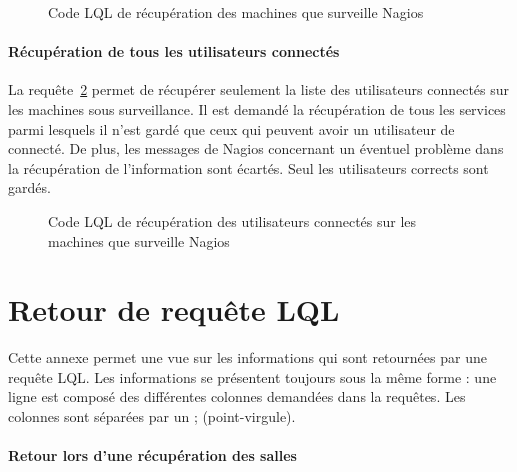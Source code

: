 \begin{appendices}
\begin{figure}[!ht]
	
	\caption{Code LQL de r\'ecup\'eration des machines que surveille Nagios}
	\label{annexe:nagiosGetResources}

\end{figure}

\subsubsection{R\'ecup\'eration de tous les utilisateurs connect\'es}

La requ\^ete~\ref{annexe:nagiosGetUsersLogged} permet de r\'ecup\'erer seulement la liste des utilisateurs connect\'es sur les machines sous surveillance.
Il est demand\'e la r\'ecup\'eration de tous les services parmi lesquels il n'est gard\'e que ceux qui peuvent avoir un utilisateur de connect\'e.
De plus, les messages de Nagios concernant un \'eventuel probl\`eme dans la r\'ecup\'eration de l'information sont \'ecart\'es.
Seul les utilisateurs \og corrects\fg{} sont gard\'es.

\vspace{0.20cm}

\begin{figure}[!ht]
	
	\caption{Code LQL de r\'ecup\'eration des utilisateurs connect\'es sur les machines que surveille Nagios}
	\label{annexe:nagiosGetUsersLogged}

\end{figure}

\chapter{Retour de requ\^ete LQL}
\label{chapterAnnexe:reponseLQLNagios}

Cette annexe permet une vue sur les informations qui sont retourn\'ees par une requ\^ete LQL.
Les informations se pr\'esentent toujours sous la m\^eme forme : une ligne est compos\'e des diff\'erentes colonnes demand\'ees dans la requ\^etes.
Les colonnes sont s\'epar\'ees par un \textsf{; (point-virgule)}.

\subsubsection{Retour lors d'une r\'ecup\'eration des salles}


\end{appendices}
